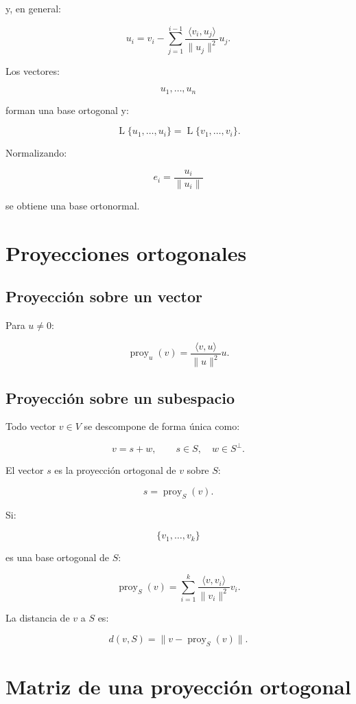 \documentclass[11pt,a4paper]{article}
\newcommand{\Span}{\operatorname{L}}
\newcommand{\proy}{\operatorname{proy}}
\begin{document}
y, en general:

\[
\boxed{
u_i
=
v_i
-
\sum_{j=1}^{i-1}
\frac{\langle v_i,u_j\rangle}
{\|u_j\|^2}u_j.
}
\]

Los vectores:

\[
u_1,\ldots,u_n
\]

forman una base ortogonal y:

\[
\Span\{u_1,\ldots,u_i\}
=
\Span\{v_1,\ldots,v_i\}.
\]

Normalizando:

\[
\boxed{
e_i=
\frac{u_i}{\|u_i\|}
}
\]

se obtiene una base ortonormal.

\section{Proyecciones ortogonales}

\subsection{Proyección sobre un vector}

Para $u\neq0$:

\[
\boxed{
\proy_u(v)
=
\frac{\langle v,u\rangle}
{\|u\|^2}u.
}
\]

\subsection{Proyección sobre un subespacio}

Todo vector $v\in V$ se descompone de forma única como:

\[
\boxed{
v=s+w,
\qquad
s\in S,
\quad
w\in S^\perp.
}
\]

El vector $s$ es la proyección ortogonal de $v$ sobre $S$:

\[
s=\proy_S(v).
\]

Si:

\[
\{v_1,\ldots,v_k\}
\]

es una base ortogonal de $S$:

\[
\boxed{
\proy_S(v)
=
\sum_{i=1}^k
\frac{\langle v,v_i\rangle}
{\|v_i\|^2}v_i.
}
\]

La distancia de $v$ a $S$ es:

\[
\boxed{
d(v,S)
=
\|v-\proy_S(v)\|.
}
\]

\section{Matriz de una proyección ortogonal}
\end{document}
